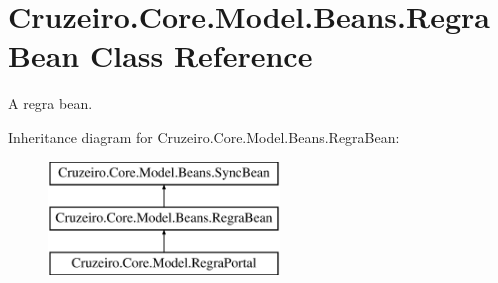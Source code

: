 \hypertarget{class_cruzeiro_1_1_core_1_1_model_1_1_beans_1_1_regra_bean}{}\section{Cruzeiro.\+Core.\+Model.\+Beans.\+Regra\+Bean Class Reference}
\label{class_cruzeiro_1_1_core_1_1_model_1_1_beans_1_1_regra_bean}


A regra bean.  


Inheritance diagram for Cruzeiro.\+Core.\+Model.\+Beans.\+Regra\+Bean\+:\begin{figure}[H]
\begin{center}
\leavevmode
\includegraphics[height=3.000000cm]{class_cruzeiro_1_1_core_1_1_model_1_1_beans_1_1_regra_bean}
\end{center}
\end{figure}
